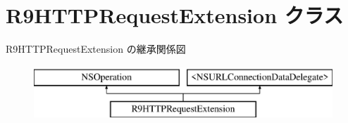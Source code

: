 \hypertarget{interface_r9_h_t_t_p_request_extension}{}\section{R9\+H\+T\+T\+P\+Request\+Extension クラス}
\label{interface_r9_h_t_t_p_request_extension}
R9\+H\+T\+T\+P\+Request\+Extension の継承関係図\begin{figure}[H]
\begin{center}
\leavevmode
\includegraphics[height=2.000000cm]{interface_r9_h_t_t_p_request_extension}
\end{center}
\end{figure}

